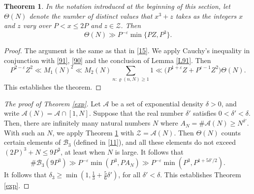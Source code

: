 \documentclass[reqno]{amsart}
\renewcommand\rho{\varrho}
\newtheorem{thm}{Theorem}[section]
\numberwithin{equation}{section}
\begin{document}
\begin{thm}
\label{thm91} In the notation introduced at the beginning of this section, let $\Theta(N)$ denote the number of distinct values that $x^3+z$ takes as the integers $x$ and $z$ vary over $P<x\le 2P$ and $z\in \mathscr Z$. Then
$$ \Theta (N) \gg P^{-\varepsilon} \min\{ PZ, P^3\}. $$
\end{thm} 

\begin{proof} The argument is the same as that in \eqref{15}. We apply Cauchy's inequality in conjunction with \eqref{91},
\eqref{90} and the conclusion of Lemma \ref{L91}. Then
$$ P^{2-\varepsilon}Z^2 \ll M_1(N)^2 \ll M_2(N) \sum_{n: \rho(n,N)\ge 1} 1
\ll  \big( P^{1+\varepsilon} Z + P^{\varepsilon-1} Z^2\big)\Theta(N). $$
This establishes the theorem.
\end{proof}

\begin{proof}[The proof of Theorem \ref{exp}]
Let $\mathscr A$ be a set of exponential density $\delta>0$, and write $\mathscr A(N) = \mathscr A\cap [1,N]$. Suppose that the real number $\delta'$ satisfies $0<\delta'<\delta$. Then, there are infinitely many natural numbers $N$ where $A_N=\# \mathscr A(N) \ge N^{\delta'}$. With such an $N$, we apply Theorem \ref{thm91} with $\mathscr Z = \mathscr A(N)$. Then $\Theta(N)$
counts certain elements of $\mathscr B_3$ (defined in \eqref{11}), and all these elements do not exceed $(2P)^3+N \le 9P^3$, at least when $N$ is large.
It follows that
$$ \#\mathscr B_3(9P^3) \gg  P^{-\varepsilon} \min(P^3, PA_N) \gg P^{-\varepsilon}  \min(P^3, P^{1+5\delta'/2}). $$
It follows that $\delta_3\ge \min(1, \frac13+\frac56\delta')$, for all $\delta'<\delta$. This establishes Theorem \ref{exp}. 
\end{proof}
\end{document}
